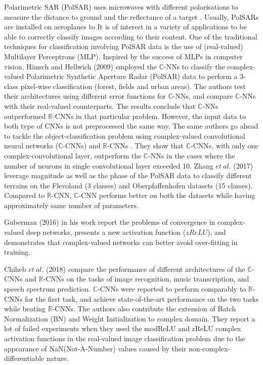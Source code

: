 Polarimetric SAR (PolSAR) uses microwaves with different polarisations to measure the distance to ground and the reflectance of a target \cite{hansch2009classification}. Usually, PolSARs are installed on aeroplanes to It is of interest in a variety of applications to be able to correctly classify images according to their content. One of the traditional techniques for classification involving PolSAR data is the use of (real-valued) Multilayer Perceptrons (MLP). Inspired by the success of MLPs in computer vision, H\"{a}nsch and Hellwich (2009) \cite{hansch2009classification} employed the $\mathbb{C}$-NNs to classify the complex-valued Polarimetric Synthetic Aperture Radar (PolSAR) data to perform a 3-class pixel-wise classification (forest, fields and urban areas). The authors test their architectures using different error functions for $\mathbb{C}$-NNs, and compare $\mathbb{C}$-NNs with their real-valued counterparts. The results conclude that $\mathbb{C}$-NNs outperformed $\mathbb{R}$-CNNs in that particular problem. However, the input data to both type of CNNs is not preprocessed the same way. The same authors go ahead to tackle the object-classification problem using complex-valued convolutional neural networks ($\mathbb{C}$-CNNs) and $\mathbb{R}$-CNNs \cite{hansch2010complex}. They show that $\mathbb{C}$-CNNs, with only one complex-convolutional layer, outperform the $\mathbb{C}$-NNs in the cases where the number of neurons in single convolutional layer exceeded 10. Zhang $et \ al.$ (2017) \cite{polsarzhang2017complex} leverage magnitude as well as the phase of the PolSAR data to classify different terrains on the Flevoland (3 classes) and Oberpfaffenhofen datasets (15 classes). Compared to $\mathbb{R}$-CNN, $\mathbb{C}$-CNN performs better on both the datasets while having approximately same number of parameters.  

Guberman (2016) \cite{Guberman} in his work report the problems of convergence in complex-valued deep networks, presents a new activation function ($zReLU$), and demonstrates that complex-valued networks can better avoid over-fitting in training. 

Chiheb $et \ al.$ (2018) \cite{trabelsi2018deep} compare the performance of different architectures of the $\mathbb{C}$-CNNs and $\mathbb{R}$-CNNs on the tasks of image recognition, music transcription, and speech spectrum prediction. $\mathbb{C}$-CNNs were reported to perform comparably to $\mathbb{R}$-CNNs for the first task, and achieve state-of-the-art performance on the two tasks while beating $\mathbb{R}$-CNNs. The authors also contribute the extension of Batch Normalization (BN) and Weight Initialization to complex domain. They report a lot of failed experiments when they used the modReLU and zReLU complex activation functions in the real-valued image classification problem due to the appearance of NaN(Not-A-Number) values caused by their non-complex-differentiable nature. 

